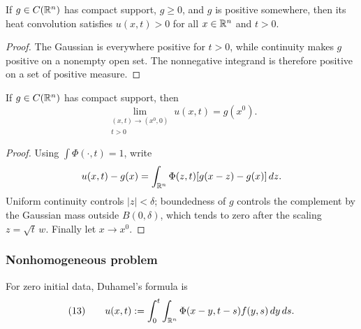 \begin{lemma}
\label{lem:heat-infinite-propagation-speed}




If $g\in C(\mathbb{R}^n)$ has compact support, $g\ge0$, and $g$ is positive somewhere,
then its heat convolution satisfies $u(x,t)>0$ for all $x\in\mathbb{R}^n$ and $t>0$.
\end{lemma}
\begin{proof}

\sketch The Gaussian is everywhere positive for $t>0$, while continuity makes
$g$ positive on a nonempty open set. The nonnegative integrand is therefore
positive on a set of positive measure.
\end{proof}

\begin{lemma}
\label{lem:heat-convolution-attains-initial-data}





If $g\in C(\mathbb{R}^n)$ has compact support, then
$$\lim_{\substack{(x,t)\to(x^0,0)\\t>0}}u(x,t)=g(x^0).$$
\end{lemma}
\begin{proof}

\sketch Using $\int\Phi(\cdot,t)=1$, write
$$u(x,t)-g(x)=\int_{\mathbb{R}^n}\Phi(z,t)[g(x-z)-g(x)]\,dz.$$
Uniform continuity controls $|z|<\delta$; boundedness of $g$ controls the
complement by the Gaussian mass outside $B(0,\delta)$, which tends to zero
after the scaling $z=\sqrt t\,w$. Finally let $x\to x^0$.
\end{proof}

\subsubsection{Nonhomogeneous problem}
\label{sec:heat-nonhomogeneous-problem}

For zero initial data, Duhamel's formula is
$$(13)\qquad
u(x,t):=\int_0^t\int_{\mathbb{R}^n}
\Phi(x-y,t-s)f(y,s)\,dy\,ds.$$

